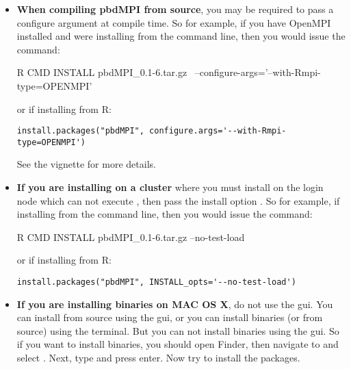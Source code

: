 \begin{itemize}
  \item \textbf{When compiling pbdMPI from source}, you may be required to pass a configure argument at compile time.  So for example, if you have OpenMPI installed and were installing from the command line, then you would issue the command:
\begin{Code}
R CMD INSTALL pbdMPI_0.1-6.tar.gz \
        --configure-args='--with-Rmpi-type=OPENMPI'
\end{Code}
  or if installing from R:
  \begin{lstlisting}[language=rr]
install.packages("pbdMPI", configure.args='--with-Rmpi-type=OPENMPI')
\end{lstlisting}
  See the  vignette for more details.

  
  \item \textbf{If you are installing on a cluster} where you must install on the login node which can not execute , then pass the install option .    So for example, if installing from the command line, then you would issue the command:
\begin{Code}
R CMD INSTALL pbdMPI_0.1-6.tar.gz --no-test-load
\end{Code}
  or if installing from R:
  \begin{lstlisting}[language=rr]
install.packages("pbdMPI", INSTALL_opts='--no-test-load')
\end{lstlisting}

  
  \item \textbf{If you are installing binaries on MAC OS X}, do not use the gui.  You can install from source using the gui, or you can install binaries (or from source) using the terminal.  But you can not install binaries using the gui.  So if you want to install binaries,  you should open Finder, then navigate to  and select .  Next, type  and press enter.  Now try to install the packages.

\end{itemize}
